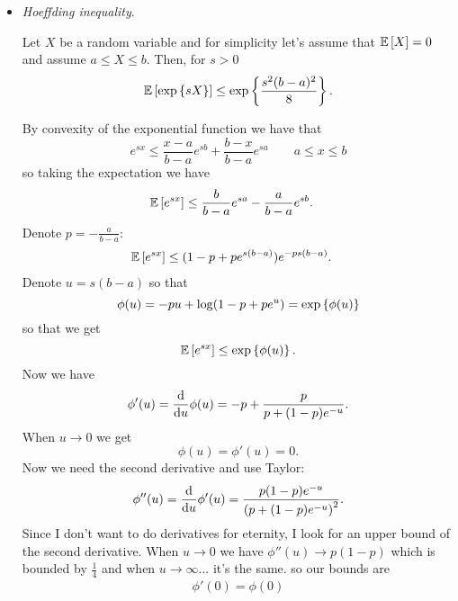 \documentclass[12pt]{report}
\begin{document}
\begin{itemize}
	\item \emph{Hoeffding inequality}.
	\begin{proposition}
		Let $X$ be a random variable and for simplicity let's assume that $\mathbb{E}\left[X\right]=0$ and assume $a\leq X\leq b$. Then, for $s>0$ 
		\begin{equation*}
			\mathbb{E}\left[\exp\left\{sX\right\}\right]\leq\exp\left\{\frac{s^{2}(b-a)^{2}}{8}\right\}.
		\end{equation*}
	\end{proposition} \begin{fancyproof}
	By convexity of the exponential function we have that
	\begin{equation*}
		e^{sx}\leq\frac{x-a}{b-a}e^{sb}+\frac{b-x}{b-a}e^{sa}\qquad a\leq x\leq b
	\end{equation*}
	so taking the expectation we have 
	\begin{align*}
		\mathbb{E}\left[e^{sx}\right]&\leq\frac{b}{b-a}e^{sa}-\frac{a}{b-a}e^{sb}.
	\end{align*}
	Denote $p=-\frac{a}{b-a}$:
	\begin{align*}
		\mathbb{E}\left[e^{sx}\right]&\leq(1-p+pe^{s(b-a)})e^{-ps(b-a)}.
	\end{align*}
	Denote $u=s(b-a)$ so that 
	\begin{equation*}
		\phi(u)=-pu+\log(1-p+pe^{u})=\exp\left\{\phi(u)\right\}
	\end{equation*}
	so that we get
	\begin{equation*}
		\mathbb{E}\left[e^{sx}\right]\leq\exp\left\{\phi(u)\right\}.
	\end{equation*}
	Now we have
	\begin{equation*}
		\phi'(u)=\frac{\mathop{}\!\mathrm{d}}{\mathop{}\!\mathrm{d} u}\phi(u)=-p+\frac{p}{p+(1-p)e^{-u}}.
	\end{equation*}
	When $u\to0$ we get
	\begin{equation*}
		\phi(u)=\phi'(u)=0.
	\end{equation*}
	Now we need the second derivative and use Taylor:
	\begin{equation*}
		\phi''(u)=\frac{\mathop{}\!\mathrm{d}}{\mathop{}\!\mathrm{d} u}\phi'(u)=\frac{p(1-p)e^{-u}}{\left(p+(1-p)e^{-u}\right)^{2}}.
	\end{equation*}
	Since I don't want to do derivatives for eternity, I look for an upper bound of the second derivative.
	When $u\to0$ we have $\phi''(u)\to p(1-p)$ which is bounded by $\frac{1}{4}$ and when $u\to\infty$... it's the same. so our bounds are
	\begin{equation*}
		\begin{array}{c}
			\phi'(0)=\phi(0)\\

\end{array}
\end{equation*}
\end{fancyproof}
\end{itemize}
\end{document}

